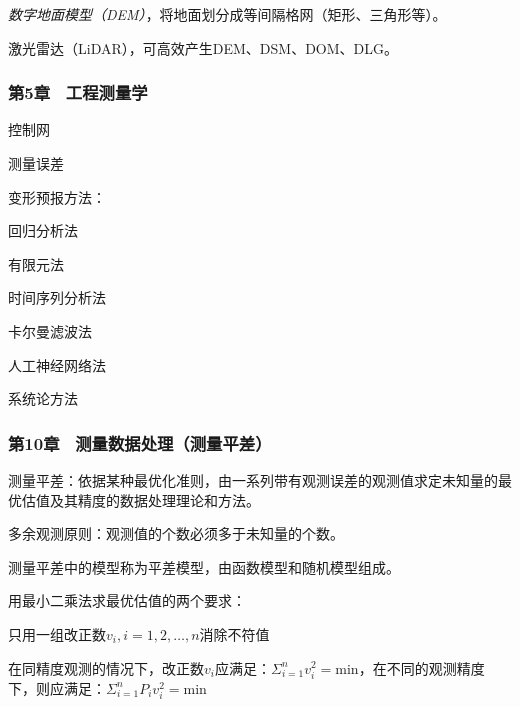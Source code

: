 \emph{数字地面模型（DEM）}，将地面划分成等间隔格网（矩形、三角形等）。

激光雷达（LiDAR），可高效产生DEM、DSM、DOM、DLG。

\subsubsection{第5章 \ 工程测量学}

控制网

测量误差

变形预报方法：
\begin{itemize*}
    \item 回归分析法
    \item 有限元法
    \item 时间序列分析法
    \item 卡尔曼滤波法
    \item 人工神经网络法
    \item 系统论方法
\end{itemize*}


\subsubsection{第10章 \ 测量数据处理（测量平差）}

测量平差：依据某种最优化准则，由一系列带有观测误差的观测值求定未知量的最优估值及其精度的数据处理理论和方法。

多余观测原则：观测值的个数必须多于未知量的个数。

测量平差中的模型称为平差模型，由函数模型和随机模型组成。

用最小二乘法求最优估值的两个要求：
\begin{itemize*}
    \item 只用一组改正数$v_i, i=1,2,\ldots,n$消除不符值
    \item 在同精度观测的情况下，改正数$v_i$应满足：$\Sigma_{i=1}^n v_i^2 = \mathrm{min}$，在不同的观测精度下，则应满足：$\Sigma_{i=1}^n P_i v_i^2 = \mathrm{min}$
\end{itemize*}